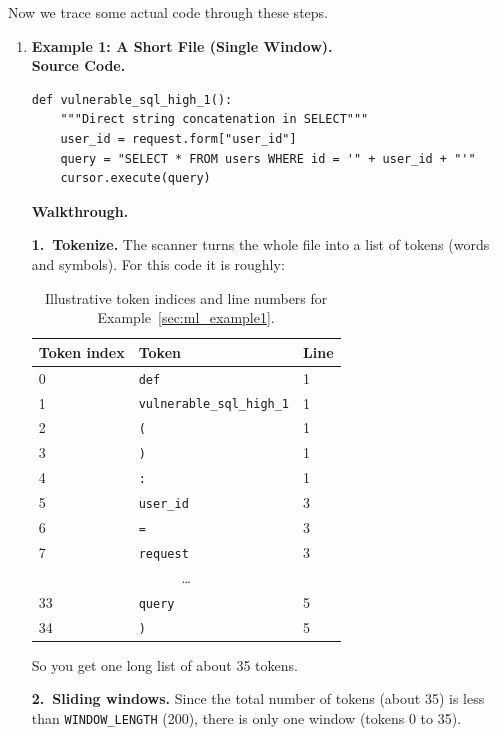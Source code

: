 Now we trace some actual code through these steps.

\begin{enumerate}
  \item \textbf{Example 1: A Short File (Single Window).}\\
  \textbf{Source Code.}

\begin{lstlisting}[style=pycode]
def vulnerable_sql_high_1():
    """Direct string concatenation in SELECT"""
    user_id = request.form["user_id"]
    query = "SELECT * FROM users WHERE id = '" + user_id + "'"
    cursor.execute(query)
\end{lstlisting}

  \textbf{Walkthrough.}

  \textbf{1.~Tokenize.} The scanner turns the whole file into a list of tokens (words and
  symbols). For this code it is roughly:

\begin{table}[H]
  \centering
  \begin{tabular}{lll}
    \textbf{Token index} & \textbf{Token} & \textbf{Line} \\
    \hline
    0  & \texttt{def}                   & 1 \\
    1  & \texttt{vulnerable\_sql\_high\_1} & 1 \\
    2  & \texttt{(}                     & 1 \\
    3  & \texttt{)}                     & 1 \\
    4  & \texttt{:}                     & 1 \\
    5  & \texttt{user\_id}              & 3 \\
    6  & \texttt{=}                     & 3 \\
    7  & \texttt{request}               & 3 \\
    \multicolumn{3}{c}{\dots} \\
    33 & \texttt{query}                 & 5 \\
    34 & \texttt{)}                     & 5 \\
  \end{tabular}
  \caption{Illustrative token indices and line numbers for Example~\ref{sec:ml_example1}.}
\end{table}

  So you get one long list of about 35 tokens.

  \textbf{2.~Sliding windows.} Since the total number of tokens (about 35) is less than
  \texttt{WINDOW\_LENGTH} (200), there is only one window (tokens 0 to 35).


\end{enumerate}
